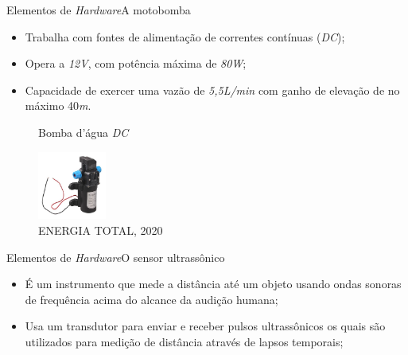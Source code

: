 \begin{frame}{Elementos de \textit{Hardware}}{A motobomba}
    \begin{itemize}
        \item Trabalha com fontes de alimentação de correntes contínuas (\textit{DC});
        \item Opera a \textit{12V}, com potência máxima de \textit{80W};
        \item Capacidade de exercer uma vazão de \textit{5,5L/min} com ganho de elevação de no máximo 40\textit{m}.
    \end{itemize}

    \begin{figure}[H]
        \centering
        \caption{Bomba d'água \textit{DC}}
        \includegraphics[width=0.2\textwidth]{figuras/bomba.jpeg}
        \caption*{\tiny{ENERGIA TOTAL, 2020}}
        \label{fig:bomba}
    \end{figure}

\end{frame}

\begin{frame}{Elementos de \textit{Hardware}}{O sensor ultrassônico}
    \begin{itemize}
        \item {É um instrumento que mede a distância até um objeto usando ondas sonoras de frequência acima do alcance da audição humana;}
        \item {Usa um transdutor para enviar e receber pulsos ultrassônicos os quais são utilizados para medição de distância através de lapsos temporais;}
    \end{itemize}
\end{frame}

